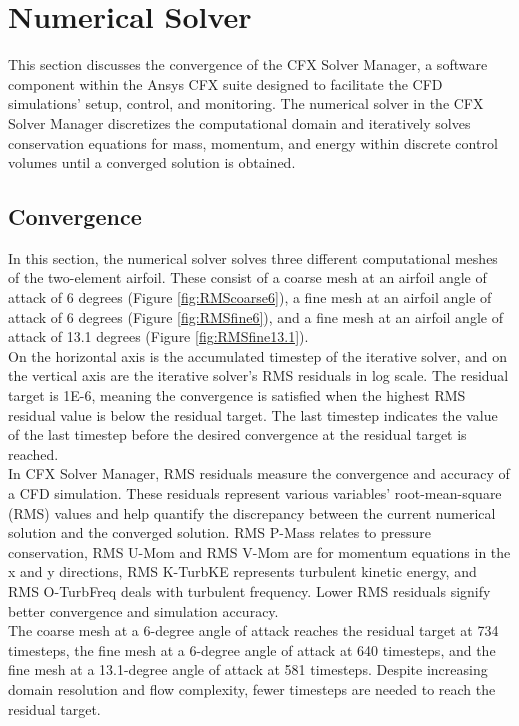 \section{Numerical Solver}
This section discusses the convergence of the CFX Solver Manager, a software component within the Ansys CFX suite designed to facilitate the CFD simulations' setup, control, and monitoring. The numerical solver in the CFX Solver Manager discretizes the computational domain and iteratively solves conservation equations for mass, momentum, and energy within discrete control volumes until a converged solution is obtained.


\subsection{Convergence}

In this section, the numerical solver solves three different computational meshes of the two-element airfoil. These consist of a coarse mesh at an airfoil angle of attack of 6 degrees (Figure \ref{fig:RMScoarse6}), a fine mesh at an airfoil angle of attack of 6 degrees (Figure \ref{fig:RMSfine6}), and a fine mesh at an airfoil angle of attack of 13.1 degrees (Figure \ref{fig:RMSfine13.1}). \\


On the horizontal axis is the accumulated timestep of the iterative solver, and on the vertical axis are the iterative solver's RMS residuals in log scale. The residual target is 1E-6, meaning the convergence is satisfied when the highest RMS residual value is below the residual target. The last timestep indicates the value of the last timestep before the desired convergence at the residual target is reached. \\

In CFX Solver Manager, RMS residuals measure the convergence and accuracy of a CFD simulation. These residuals represent various variables' root-mean-square (RMS) values and help quantify the discrepancy between the current numerical solution and the converged solution. RMS P-Mass relates to pressure conservation, RMS U-Mom and RMS V-Mom are for momentum equations in the x and y directions, RMS K-TurbKE represents turbulent kinetic energy, and RMS O-TurbFreq deals with turbulent frequency. Lower RMS residuals signify better convergence and simulation accuracy. \\

The coarse mesh at a 6-degree angle of attack reaches the residual target at 734 timesteps, the fine mesh at a 6-degree angle of attack at 640 timesteps, and the fine mesh at a 13.1-degree angle of attack at 581 timesteps. Despite increasing domain resolution and flow complexity, fewer timesteps are needed to reach the residual target. \\

